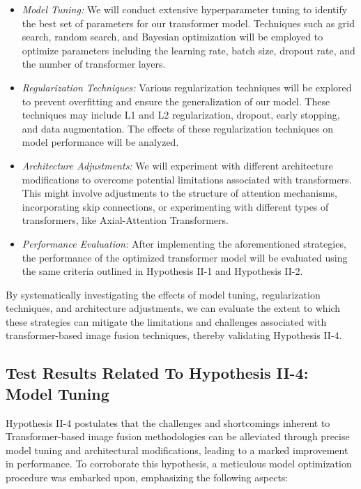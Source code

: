 \begin{itemize}
    \item \textit{Model Tuning:} We will conduct extensive hyperparameter tuning to identify the best set of parameters for our transformer model. Techniques such as grid search, random search, and Bayesian optimization will be employed to optimize parameters including the learning rate, batch size, dropout rate, and the number of transformer layers.

    \item \textit{Regularization Techniques:} Various regularization techniques will be explored to prevent overfitting and ensure the generalization of our model. These techniques may include L1 and L2 regularization, dropout, early stopping, and data augmentation. The effects of these regularization techniques on model performance will be analyzed.

    \item \textit{Architecture Adjustments:} We will experiment with different architecture modifications to overcome potential limitations associated with transformers. This might involve adjustments to the structure of attention mechanisms, incorporating skip connections, or experimenting with different types of transformers, like Axial-Attention Transformers.

    \item \textit{Performance Evaluation:} After implementing the aforementioned strategies, the performance of the optimized transformer model will be evaluated using the same criteria outlined in Hypothesis II-1 and Hypothesis II-2.
\end{itemize}


By systematically investigating the effects of model tuning, regularization techniques, and architecture adjustments, we can evaluate the extent to which these strategies can mitigate the limitations and challenges associated with transformer-based image fusion techniques, thereby validating Hypothesis II-4.

\subsection{Test Results Related To Hypothesis II-4: Model Tuning} \label{subsec:met8res}

Hypothesis II-4 postulates that the challenges and shortcomings inherent to Transformer-based image fusion methodologies can be alleviated through precise model tuning and architectural modifications, leading to a marked improvement in performance. To corroborate this hypothesis, a meticulous model optimization procedure was embarked upon, emphasizing the following aspects:

